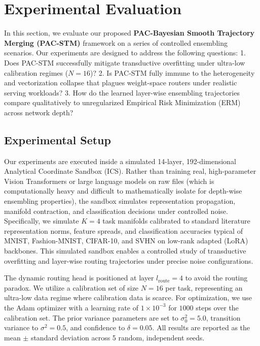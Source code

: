 \section{Experimental Evaluation}
\label{sec:experiments}

In this section, we evaluate our proposed \textbf{PAC-Bayesian Smooth Trajectory Merging (PAC-STM)} framework on a series of controlled ensembling scenarios. Our experiments are designed to address the following questions:
1. Does PAC-STM successfully mitigate transductive overfitting under ultra-low calibration regimes ($N = 16$)?
2. Is PAC-STM fully immune to the heterogeneity and vectorization collapse that plagues weight-space routers under realistic serving workloads?
3. How do the learned layer-wise ensembling trajectories compare qualitatively to unregularized Empirical Risk Minimization (ERM) across network depth?

\subsection{Experimental Setup}
Our experiments are executed inside a simulated 14-layer, 192-dimensional Analytical Coordinate Sandbox (ICS). Rather than training real, high-parameter Vision Transformers or large language models on raw files (which is computationally heavy and difficult to mathematically isolate for depth-wise ensembling properties), the sandbox simulates representation propagation, manifold contraction, and classification decisions under controlled noise. Specifically, we simulate $K=4$ task manifolds calibrated to standard literature representation norms, feature spreads, and classification accuracies typical of MNIST, Fashion-MNIST, CIFAR-10, and SVHN on low-rank adapted (LoRA) backbones. This simulated sandbox enables a controlled study of transductive overfitting and layer-wise routing trajectories under precise noise configurations.

The dynamic routing head is positioned at layer $l_{\text{route}} = 4$ to avoid the routing paradox. We utilize a calibration set of size $N = 16$ per task, representing an ultra-low data regime where calibration data is scarce. For optimization, we use the Adam optimizer with a learning rate of $1\times 10^{-3}$ for $1000$ steps over the calibration set. The prior variance parameters are set to $\sigma_0^2 = 5.0$, transition variance to $\sigma^2 = 0.5$, and confidence to $\delta = 0.05$. All results are reported as the mean $\pm$ standard deviation across 5 random, independent seeds.

